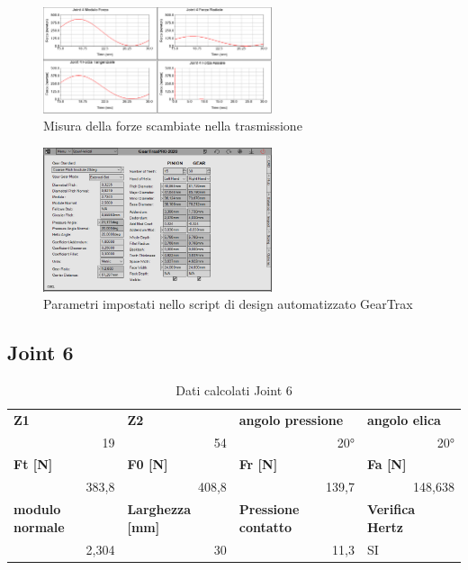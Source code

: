\documentclass[%
corpo=11pt,
twoside,
 stile=classica,
oldstyle,
greek,%
]{toptesi}
\begin{document}
		\begin{figure}
			\centering
			\includegraphics[width=0.6\textwidth]{Plots/POLSO2/polso2forces.png}
			\caption{Misura della forze scambiate nella trasmissione}
			\label{fig:MBDpolso2f}
		\end{figure} 
		\begin{figure}
			\centering
			\includegraphics[width=0.6\textwidth]{Plots/POLSO2/gear_polso2.png}
			\caption{Parametri impostati nello script di design automatizzato GearTrax}
			\label{fig:Gearpolso2}
		\end{figure} 
	
	
	\subsection{Joint 6}
	
	
		\begin{table}[htbp]
		\centering
		\caption{Dati calcolati Joint 6}
		\begin{tabular}{rrrl}
			\multicolumn{1}{l}{\textbf{Z1}} & \multicolumn{1}{l}{\textbf{Z2}} & \multicolumn{1}{l}{\textbf{angolo pressione}} & \textbf{angolo elica} \\
			19    & 54    & 20°    & \multicolumn{1}{r}{20°} \\
			\multicolumn{1}{l}{\textbf{Ft [N]}} & \multicolumn{1}{l}{\textbf{F0 [N]}} & \multicolumn{1}{l}{\textbf{Fr [N]}} & \textbf{Fa [N]} \\
			383,8 & 408,8 & 139,7 & \multicolumn{1}{r}{148,638} \\
			\multicolumn{1}{l}{\textbf{modulo normale}} & \multicolumn{1}{l}{\textbf{Larghezza [mm]}} & \multicolumn{1}{l}{\textbf{Pressione contatto}} & \textbf{Verifica Hertz} \\
			2,304 & 30    & 11,3  & SI \\
		\end{tabular}%
		\label{tab:lewis3}%
	\end{table}%
\end{document}
